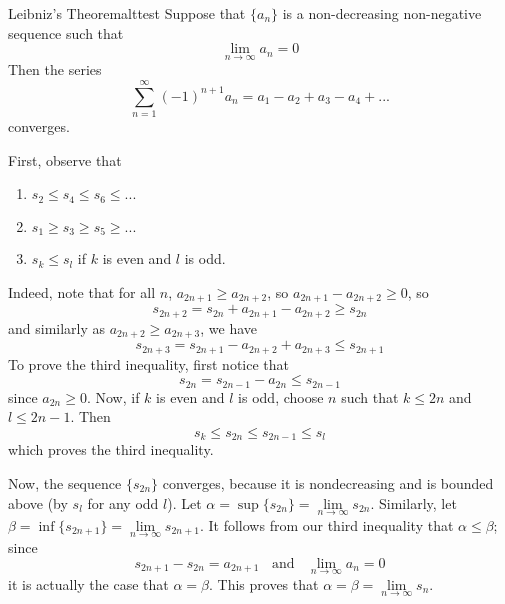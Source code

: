 \documentclass[12pt]{report}
\begin{document}
\begin{namthm}{Leibniz's Theorem}{alttest}
    Suppose that $\{a_n\}$ is a non-decreasing non-negative sequence such that \begin{equation*}
        \lim\limits_{n\rightarrow \infty} a_n = 0
    \end{equation*}
    Then the series \begin{equation*}
        \sum\limits_{n=1}^{\infty}(-1)^{n+1}a_n = a_1-a_2+a_3-a_4+...
    \end{equation*}
    converges.
\end{namthm}
\begin{proof*}{}{}
    First, observe that \begin{enumerate}
        \item $s_2 \leq s_4 \leq s_6 \leq ...$
        \item $s_1 \geq s_3 \geq s_5 \geq ...$ 
        \item $s_k\leq s_l$ if $k$ is even and $l$ is odd.
    \end{enumerate}
    Indeed, note that for all $n$, $a_{2n+1} \geq a_{2n+2}$, so $a_{2n+1} - a_{2n+2} \geq 0$, so \begin{equation*}
        s_{2n+2} = s_{2n} + a_{2n+1} - a_{2n+2} \geq s_{2n}
    \end{equation*}
    and similarly as $a_{2n+2} \geq a_{2n+3}$, we have \begin{equation*}
        s_{2n+3} = s_{2n+1} -a_{2n+2}+a_{2n+3} \leq s_{2n+1}
    \end{equation*}
    To prove the third inequality, first notice that \begin{equation*}
        s_{2n} = s_{2n-1} - a_{2n} \leq s_{2n-1}
    \end{equation*}
    since $a_{2n} \geq 0$. Now, if $k$ is even and $l$ is odd, choose $n$ such that $k\leq 2n$ and $l \leq 2n-1$. Then \begin{equation*}
        s_k \leq s_{2n} \leq s_{2n-1} \leq s_l
    \end{equation*}
    which proves the third inequality.

    Now, the sequence $\{s_{2n}\}$ converges, because it is nondecreasing and is bounded above (by $s_l$ for any odd $l$). Let $\alpha = \sup\{s_{2n}\} = \lim\limits_{n\rightarrow\infty} s_{2n}$. Similarly, let $\beta = \inf\{s_{2n+1}\} = \lim\limits_{n\rightarrow \infty}s_{2n+1}$. It follows from our third inequality that $\alpha \leq \beta$; since \begin{equation*}
        s_{2n+1}-s_{2n} = a_{2n+1}\;\;\text{ and }\;\;\lim\limits_{n\rightarrow \infty}a_n = 0
    \end{equation*}
    it is actually the case that $\alpha = \beta$. This proves that $\alpha = \beta = \lim\limits_{n\rightarrow \infty} s_n$.
\end{proof*}
\end{document}

